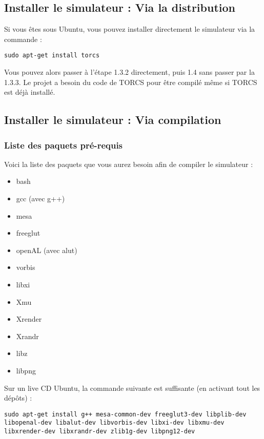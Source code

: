 \documentclass[a4paper,12pt]{article}
\begin{document}
  \subsection{Installer le simulateur : Via la distribution}
  
  Si vous êtes sous Ubuntu, vous pouvez installer directement le simulateur via la commande :
  
    \begin{lstlisting}
sudo apt-get install torcs
    \end{lstlisting}
    
    Vous pouvez alors passer à l'étape 1.3.2 directement, puis 1.4 sans passer par la 1.3.3.
    Le projet a besoin du code de TORCS pour être compilé même si TORCS est déjà installé.
  
  \subsection{Installer le simulateur : Via compilation}
 
  \subsubsection{Liste des paquets pré-requis}
  Voici la liste des paquets que vous aurez besoin afin de compiler le simulateur :
  \begin{multicols}{2}
    \begin{itemize}
    \item bash
    \item gcc (avec g++)
    \item mesa
    \item freeglut
    \item openAL (avec alut)
    \item vorbis
    \item libxi
    \item Xmu
    \item Xrender
    \item Xrandr
    \item libz
    \item libpng
    \end{itemize}
  \end{multicols}
  
  Sur un live CD Ubuntu, la commande suivante est suffisante (en activant tout les dépôts) :
  \begin{lstlisting}
sudo apt-get install g++ mesa-common-dev freeglut3-dev libplib-dev libopenal-dev libalut-dev libvorbis-dev libxi-dev libxmu-dev libxrender-dev libxrandr-dev zlib1g-dev libpng12-dev 
    \end{lstlisting}
\end{document}

